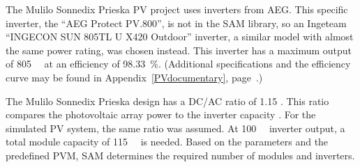

The Mulilo Sonnedix Prieska PV project uses inverters from AEG. This specific inverter, the \enquote{AEG Protect PV.800}, is not in the SAM library, so an Ingeteam \enquote{INGECON SUN 805TL U X420 Outdoor} inverter, a similar model with almost the same power rating, was chosen instead. This inverter has a maximum output of \SI{805}{\kilo\wattsac} at an efficiency of \SI{98.33}{\percent}. (Additional specifications and the efficiency curve may be found in Appendix~\ref{PVdocumentary}, page~\pageref{tbl: PVinverter}.)


The Mulilo Sonnedix Prieska design has a DC/AC ratio of \num{1.15} \cite{Morse2014}. This ratio compares the photovoltaic array power to the inverter capacity \cite{Woodcock2013}. For the simulated PV system, the same ratio was assumed. At \SI{100}{\mega\wattsac} inverter output, a total module capacity of \SI{115}{\mega\wattsdc} is needed. Based on the parameters and the predefined PVM, SAM determines the required number of modules and inverters. 


